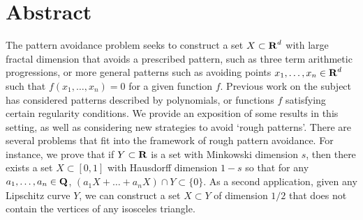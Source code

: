 
\chapter{Abstract}


The pattern avoidance problem seeks to construct a set $X \subset \operatorname{\mathbf{R}}^d$ with large fractal dimension that avoids a prescribed pattern, such as three term arithmetic progressions, or more general patterns such as avoiding points $x_1, \dots, x_n \in \operatorname{\mathbf{R}}^d$ such that $f(x_1, \dots, x_n) = 0$ for a given function $f$. Previous work on the subject has considered patterns described by polynomials, or functions $f$ satisfying certain regularity conditions. We provide an exposition of some results in this setting, as well as considering new strategies to avoid `rough patterns'. There are several problems that fit into the framework of rough pattern avoidance. For instance, we prove that if $Y \subset \operatorname{\mathbf{R}}$ is a set with Minkowski dimension $s$, then there exists a set $X \subset [0,1]$ with Hausdorff dimension $1-s$ so that for any $a_1, \dots, a_n \in \operatorname{\mathbf{Q}}$, $(a_1X + \dots + a_n X) \cap Y \subset \{ 0 \}$. As a second application, given any Lipschitz curve $Y$, we can construct a set $X \subset Y$ of dimension $1/2$ that does not contain the vertices of any isosceles triangle.